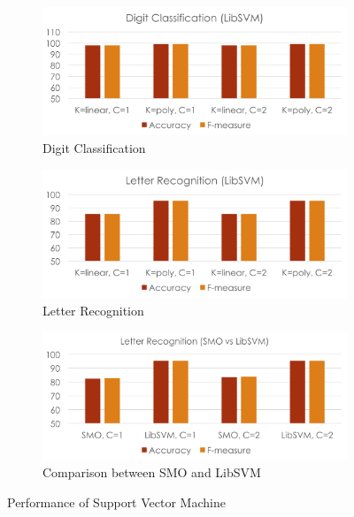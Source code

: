 \documentclass[11pt]{article}
\begin{document}
\begin{figure}[htbp]
\centering
\begin{subfigure}[htbp]{0.46\columnwidth}
\includegraphics*[width=\textwidth]{fig/digit_svm}
\caption{Digit Classification}
\label{fig:digit-svm}
\end{subfigure}
\hfill
\begin{subfigure}[htbp]{0.46\columnwidth}
\includegraphics*[width=\textwidth]{fig/letter_svm}
\caption{Letter Recognition}
\label{fig:letter-svm}
\end{subfigure}
\hfill
\begin{subfigure}[htbp]{0.46\columnwidth}
\includegraphics*[width=\textwidth]{fig/smo_libsvm}
\caption{Comparison between SMO and LibSVM}
\label{fig:smo-libsvm}
\end{subfigure}
\caption{Performance of Support Vector Machine}
\label{fig:svm}
\end{figure}
\end{document}
